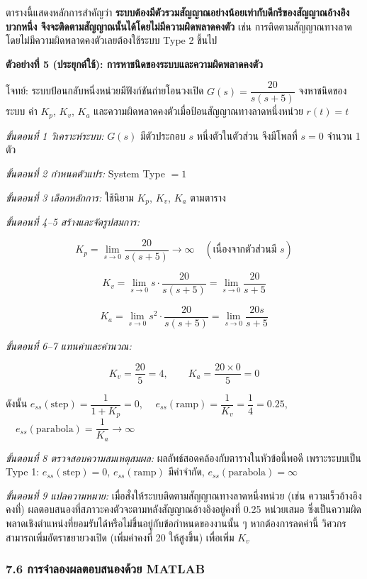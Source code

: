 ตารางนี้แสดงหลักการสำคัญว่า \textbf{ระบบต้องมีตัวรวมสัญญาณอย่างน้อยเท่ากับดีกรีของสัญญาณอ้างอิง บวกหนึ่ง จึงจะติดตามสัญญาณนั้นได้โดยไม่มีความผิดพลาดคงตัว} เช่น การติดตามสัญญาณทางลาดโดยไม่มีความผิดพลาดคงตัวเลยต้องใช้ระบบ Type 2 ขึ้นไป



\textbf{ตัวอย่างที่ 5 (ประยุกต์ใช้): การหาชนิดของระบบและความผิดพลาดคงตัว}

โจทย์: ระบบป้อนกลับหนึ่งหน่วยมีฟังก์ชันถ่ายโอนวงเปิด $G(s)=\dfrac{20}{s(s+5)}$ จงหาชนิดของระบบ ค่า $K_p$, $K_v$, $K_a$ และความผิดพลาดคงตัวเมื่อป้อนสัญญาณทางลาดหนึ่งหน่วย $r(t)=t$

\textit{ขั้นตอนที่ 1 วิเคราะห์ระบบ:} $G(s)$ มีตัวประกอบ $s$ หนึ่งตัวในตัวส่วน จึงมีโพลที่ $s=0$ จำนวน 1 ตัว

\textit{ขั้นตอนที่ 2 กำหนดตัวแปร:} System Type $= 1$

\textit{ขั้นตอนที่ 3 เลือกหลักการ:} ใช้นิยาม $K_p$, $K_v$, $K_a$ ตามตาราง

\textit{ขั้นตอนที่ 4–5 สร้างและจัดรูปสมการ:}

\[
K_p = \lim_{s\to0} \frac{20}{s(s+5)} \to \infty \quad (\text{เนื่องจากตัวส่วนมี } s)
\]

\[
K_v = \lim_{s\to0} s\cdot\frac{20}{s(s+5)} = \lim_{s\to0}\frac{20}{s+5}
\]

\[
K_a = \lim_{s\to0} s^2\cdot\frac{20}{s(s+5)} = \lim_{s\to0}\frac{20s}{s+5}
\]

\textit{ขั้นตอนที่ 6–7 แทนค่าและคำนวณ:}

\[
K_v = \frac{20}{5} = 4, \qquad K_a = \frac{20\times0}{5} = 0
\]

ดังนั้น $e_{ss}(\text{step}) = \dfrac{1}{1+K_p} = 0$, $\quad e_{ss}(\text{ramp}) = \dfrac{1}{K_v} = \dfrac{1}{4} = 0.25$, $\quad e_{ss}(\text{parabola}) = \dfrac{1}{K_a} \to \infty$

\textit{ขั้นตอนที่ 8 ตรวจสอบความสมเหตุสมผล:} ผลลัพธ์สอดคล้องกับตารางในหัวข้อนี้พอดี เพราะระบบเป็น Type 1: $e_{ss}(\text{step})=0$, $e_{ss}(\text{ramp})$ มีค่าจำกัด, $e_{ss}(\text{parabola})=\infty$

\textit{ขั้นตอนที่ 9 แปลความหมาย:} เมื่อสั่งให้ระบบติดตามสัญญาณทางลาดหนึ่งหน่วย (เช่น ความเร็วอ้างอิงคงที่) ผลตอบสนองที่สภาวะคงตัวจะตามหลังสัญญาณอ้างอิงอยู่คงที่ 0.25 หน่วยเสมอ ซึ่งเป็นความผิดพลาดเชิงตำแหน่งที่ยอมรับได้หรือไม่ขึ้นอยู่กับข้อกำหนดของงานนั้น ๆ หากต้องการลดค่านี้ วิศวกรสามารถเพิ่มอัตราขยายวงเปิด (เพิ่มค่าคงที่ 20 ให้สูงขึ้น) เพื่อเพิ่ม $K_v$



\subsubsection{7.6 การจำลองผลตอบสนองด้วย MATLAB}

